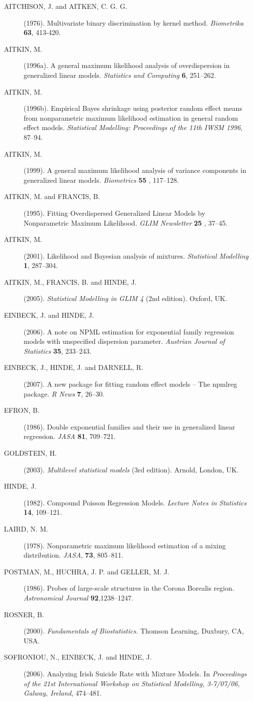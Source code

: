 \documentclass[a4paper]{article}
\begin{document}
\begin{landscape}
 \begin{description}
 \item[AITCHISON, J. and AITKEN, C. G. G.] (1976).
Multivariate binary discrimination by kernel method.
{\em Biometrika} {\bf 63}, 413-420.
 \item [AITKIN, M.] (1996a). A general maximum likelihood
analysis of overdispersion in generalized linear models.  {\em
Statistics and Computing} {\bf 6}, 251--262.
\item[AITKIN, M.](1996b). Empirical Bayes shrinkage using
posterior random effect means from nonparametric maximum likelihood
estimation in general random effect models. {\em Statistical
Modelling:  Proceedings of the 11th IWSM 1996}, 87--94.
\item[AITKIN, M.] (1999). A general maximum likelihood analysis of variance components 
in generalized linear models.  {\em Biometrics}  {\bf 55} , 117--128.
\item[AITKIN, M. and FRANCIS, B.] (1995). 
Fitting Overdispersed Generalized Linear Models by Nonparametric Maximum Likelihood.
{\em GLIM Newsletter} {\bf 25 }, 37--45.
\item[AITKIN, M.] (2001). Likelihood and
Bayesian analysis of mixtures. {\em Statistical Modelling} {\bf
1}, 287--304.
\item[AITKIN, M., FRANCIS, B. and HINDE, J. ] (2005). 
{\em Statistical Modelling in GLIM 4} (2nd edition). Oxford, UK.  
\item[EINBECK, J. and HINDE, J.] (2006).
A note on NPML estimation for exponential family regression models with unspecified dispersion parameter.
{\em Austrian Journal of Statistics} {\bf 35}, 233--243. 
\item[EINBECK, J., HINDE, J. and DARNELL, R.] (2007).
A new package for fitting random effect models -- The npmlreg package.  {\em R News} {\bf 7}, 26--30. 
\item[EFRON, B.] (1986). Double exponential families and their use in generalized linear regression.
{\em JASA} {\bf 81}, 709--721.
\item[GOLDSTEIN, H.] (2003). {\em  Multilevel statistical models} (3rd edition). Arnold, London, UK.
\item[HINDE, J. ] (1982).
Compound Poisson Regression Models.
{\em Lecture Notes in Statistics} {\bf 14}, 109--121.
\item[LAIRD, N. M. ] (1978). Nonparametric maximum likelihood estimation of a mixing distribution. {\em JASA}, {\bf 73}, 805--811.
\item[POSTMAN, M., HUCHRA, J. P. and GELLER, M. J.] (1986). Probes of large-scale structures 
in the Corona Borealis region. {\em Astronomical Journal} {\bf 92},1238--1247.
\item[ROSNER, B.] (2000). {\em Fundamentals of
Biostatistics.} Thomson Learning, Duxbury, CA, USA.
\item[SOFRONIOU, N., EINBECK, J. and HINDE, J.] (2006). Analyzing Irish Suicide Rate with Mixture Models.
 In {\em Proceedings of the 21st International Workshop on Statistical Modelling, 3-7/07/06, Galway, Ireland}, 474--481.
\end{description}
\newpage







\end{landscape}
\end{document}

